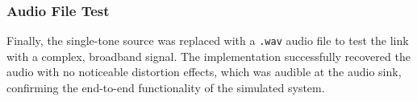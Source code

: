 \subsubsection{Audio File Test}

Finally, the single-tone source was replaced with a \texttt{.wav} audio file to test the link with a complex, broadband signal. The implementation successfully recovered the audio with no noticeable distortion effects, which was audible at the audio sink, confirming the end-to-end functionality of the simulated system.

